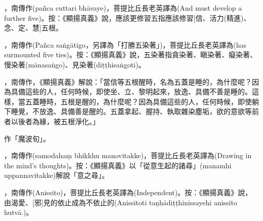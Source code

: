 \startitemgroup[noteitems]
\item{}，南傳作(pañca cuttari bhāvaye)，菩提比丘長老英譯為(And must develop a further five)。按：《顯揚真義》說，應該更修習五指應該修習[信、活力(精進)、念、定、慧]五根。
\stopitemgroup

\startitemgroup[noteitems]
\item{}，南傳作(Pañca saṅgātigo，另譯為「打勝五染著」)，菩提比丘長老英譯為(has surmounted five ties)。按：《顯揚真義》說，五染著指貪染著、瞋染著、癡染著、慢染著(mānasaṅgo)、見染著(diṭṭhisaṅgoti)。
\stopitemgroup

\startitemgroup[noteitems]
\item{}，南傳作，《顯揚真義》解說：「當信等五根醒時，名為五蓋是睡的，為什麼呢？因為具備這些的人，任何時候，即使坐、立、黎明起來，放逸、具備不善是睡的。這樣，當五蓋睡時，五根是醒的，為什麼呢？因為具備這些的人，任何時候，即使躺下睡覺，不放逸、具備善是醒的。五蓋拿起、握持、執取雜染塵垢，欲的意欲等前者以後者為緣，被五根淨化。」
\stopitemgroup

\startitemgroup[noteitems]
\item{}作「魔波旬」。
\stopitemgroup

\startitemgroup[noteitems]
\item{}，南傳作(samodahaṃ bhikkhu manovitakke)，菩提比丘長老英譯為(Drawing in the mind's thoughts)。按：《顯揚真義》以「從意生起的諸尋」(manamhi uppannavitakke)解說「意之尋」。
\stopitemgroup

\startitemgroup[noteitems]
\item{}，南傳作(Anissito)，菩提比丘長老英譯為(Independent)。按：《顯揚真義》說，由渴愛、[邪]見的依止成為不依止的(Anissitoti taṇhādiṭṭhinissayehi anissito hutvā.)。
\stopitemgroup

